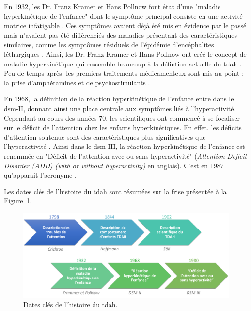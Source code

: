 En 1932, les Dr. Franz Kramer et Hans Pollnow font état d'une "maladie hyperkinétique de l'enfance" dont le symptôme principal consiste en une 
activité motrice infatigable \citep{Kramer1932}. Ces symptômes avaient déjà été mis en évidence par le passé mais n'avaient pas été différenciés 
des maladies présentant des caractéristiques similaires, comme les symptômes résiduels de l'épidémie d'encéphalites léthargiques \citep{Lange2010}. 
Ainsi, les Dr. Franz Kramer et Hans Pollnow ont créé le concept de maladie hyperkinétique qui ressemble beaucoup à la défintion actuelle
du \gls{tdah} \citep{Lange2010}. Peu de temps après, les premiers traitements médicamenteux sont mis au point : la prise d'amphétamines 
\citep{Bradley1937} et de psychostimulants \citep{Morton2000}. 

En 1968, la définition de la réaction hyperkinétique de l'enfance entre dans le \gls{dsm}-II, donnant ainsi une place centrale aux symptômes liés 
à l'hyperactivité. Cependant au cours des années 70, les scientifiques ont commencé à se focaliser sur le déficit de l'attention chez les enfants
hyperkinétiques. En effet, les déficits d'attention soutenue sont des caractéristiques plus significatives que l'hyperactivité 
\citep{Barkley2006, Douglas1972}. Ainsi dans le \gls{dsm}-III, la réaction hyperkinétique de l'enfance est renommée en "Déficit de l'attention 
avec ou sans hyperactivité" (\textit{Attention Deficit Disorder (ADD) (with or without hyperactivity)} en anglais). C'est en 1987 qu'apparait
l'acronyme  \citep{Lange2010}. 

Les dates clés de l'histoire du \gls{tdah} sont résumées sur la frise présentée à la Figure~\ref{Figure:introduction_adhd_history}.

\begin{figure}[h!]
  \centering
	\includegraphics[width=1\linewidth]{figures/chapter-1/introduction-adhd-history} 
  \caption{Dates clés de l'histoire du \gls{tdah}.}
  \label{Figure:introduction_adhd_history}
\end{figure}

